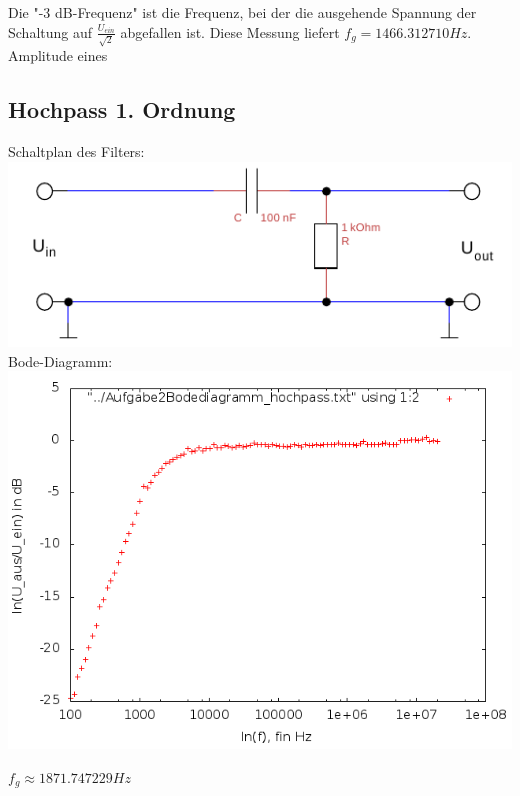 \documentclass[compress,11pt]{beamer}
\begin{document}
Die "-3 dB-Frequenz" ist die Frequenz, bei der die ausgehende Spannung der Schaltung auf $\frac{U_{ein}}{\sqrt{2}}$ abgefallen ist. Diese Messung liefert $f_g = 1466.312710 Hz$.\\
Amplitude eines 

\subsection{Hochpass 1. Ordnung}
Schaltplan des Filters:\\

\includegraphics[width=\textwidth]{../daten/Messdaten/plots/schalt_hoch}
Bode-Diagramm:\\
\includegraphics[width=\textwidth]{../daten/Messdaten/plots/Aufgabe2Bodediagramm_hochpass_gain}

$f_g \approx  1871.747229 Hz$
\end{document}
